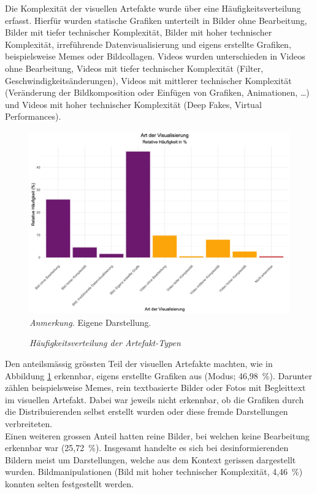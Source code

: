 \documentclass[12pt,a4paper]{article}        %
\begin{document}
Die Komplexität der visuellen Artefakte wurde über eine Häufigkeitsverteilung erfasst. Hierfür wurden statische Grafiken unterteilt in Bilder ohne Bearbeitung, Bilder mit tiefer technischer Komplexität, Bilder mit hoher technischer Komplexität, irreführende Datenvisualisierung und eigens erstellte Grafiken, beispielsweise Memes oder Bildcollagen. Videos wurden unterschieden in Videos ohne Bearbeitung, Videos mit tiefer technischer Komplexität (Filter, Geschwindigkeitsänderungen), Videos mit mittlerer technischer Komplexität (Veränderung der Bildkomposition oder Einfügen von Grafiken, Animationen, \ldots) und Videos mit hoher technischer Komplexität (Deep Fakes, Virtual Performances).
\begin{figure}[H]
  \caption{\textit{Häufigkeitsverteilung der Artefakt-Typen}}
  \label{fig:results_artefact_type}
  \centering
  \includegraphics[width=0.75\linewidth]{artefact_type_plot.png}\\
  \footnotesize\textit{Anmerkung.} Eigene Darstellung.
\end{figure}
Den anteilsmässig grössten Teil der visuellen Artefakte machten, wie in Abbildung \ref{fig:results_artefact_type} erkennbar, eigens erstellte Grafiken aus (Modus; 46,98 \%). Darunter zählen beispielsweise Memes, rein textbasierte Bilder oder Fotos mit Begleittext im visuellen Artefakt. Dabei war jeweils nicht erkennbar, ob die Grafiken durch die Distribuierenden selbst erstellt wurden oder diese fremde Darstellungen verbreiteten.\\
Einen weiteren grossen Anteil hatten reine Bilder, bei welchen keine Bearbeitung erkennbar war (25,72 \%). Insgesamt handelte es sich bei desinformierenden Bildern meist um Darstellungen, welche aus dem Kontext gerissen dargestellt wurden. Bildmanipulationen (Bild mit hoher technischer Komplexität, 4,46 \%) konnten selten festgestellt werden.
\end{document}
